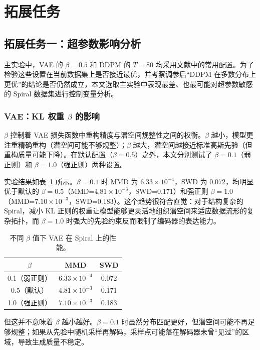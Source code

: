 \documentclass[UTF8,a4paper,12pt]{ctexart}
\begin{document}
\section{拓展任务}
\label{sec:extension}

\subsection{拓展任务一：超参数影响分析}

主实验中，VAE 的 $\beta=0.5$ 和 DDPM 的 $T=80$ 均采用文献中的常用配置。为了检验这些设置在当前数据集上是否接近最优，并考察调参后“DDPM 在多数分布上更优”的结论是否仍然成立，本文选取主实验中表现最差、也最可能对超参数敏感的 Spiral 数据集进行控制变量分析。

\subsubsection{VAE：KL 权重 \texorpdfstring{$\beta$}{beta} 的影响}

$\beta$ 控制着 VAE 损失函数中重构精度与潜空间规整性之间的权衡。$\beta$ 越小，模型更注重精确重构（潜空间可能不够规整）；$\beta$ 越大，潜空间越接近标准高斯先验（但重构质量可能下降）。在默认配置（$\beta=0.5$）之外，本文分别测试了 $\beta=0.1$（弱正则）和 $\beta=1.0$（强正则）两种设置。

实验结果如表~\ref{tab:ablation-beta} 所示。$\beta=0.1$ 时 MMD 为 $6.33\times 10^{-4}$，SWD 为 0.072，均明显优于默认的 $\beta=0.5$（MMD=$4.81\times 10^{-3}$，SWD=0.171）和强正则 $\beta=1.0$（MMD=$7.10\times 10^{-3}$，SWD=0.183）。这个趋势很符合直觉：对于结构复杂的 Spiral，减小 KL 正则的权重让模型能够更灵活地组织潜空间来适应数据流形的复杂拓扑，而 $\beta=1.0$ 时强大的先验约束反而限制了编码器的表达能力。

\begin{table}[H]
\centering
\small
\caption{不同 $\beta$ 值下 VAE 在 Spiral 上的性能。}
\label{tab:ablation-beta}
\begin{tabular}{ccc}
\toprule
$\beta$ & MMD  & SWD   \\
\midrule
0.1（弱正则） & $\mathbf{6.33}\times 10^{-4}$ & $\mathbf{0.072}$ \\
0.5（默认）   & $4.81\times 10^{-3}$ & 0.171  \\
1.0（强正则） & $7.10\times 10^{-3}$ & 0.183  \\
\bottomrule
\end{tabular}
\end{table}

但这并不意味着 $\beta$ 越小越好。$\beta=0.1$ 时虽然分布匹配更好，但潜空间可能不再足够规整；如果从先验中随机采样再解码，采样点可能落在解码器未曾“见过”的区域，导致生成质量不稳定。
\end{document}

